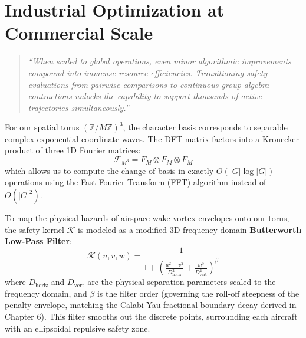 \documentclass[11pt,a4paper]{book}
\begin{document}
\section{Industrial Optimization at Commercial Scale}\label{sec:industrial_scale}
\begin{quote}
    \textit{``When scaled to global operations, even minor algorithmic improvements compound into immense resource efficiencies. Transitioning safety evaluations from pairwise comparisons to continuous group-algebra contractions unlocks the capability to support thousands of active trajectories simultaneously.''}
\end{quote}

For our spatial torus $(\mathbb{Z}/M\mathbb{Z})^3$, the character basis corresponds to separable complex exponential coordinate waves. The DFT matrix factors into a Kronecker product of three 1D Fourier matrices:
\begin{equation}
\label{eq:kronecker_fourier}
\mathcal{F}_{M^3} = F_M \otimes F_M \otimes F_M
\end{equation}
which allows us to compute the change of basis in exactly $O(\lvert G \rvert \log \lvert G \rvert)$ operations using the Fast Fourier Transform (FFT) algorithm instead of $O(\lvert G \rvert^2)$.

To map the physical hazards of airspace wake-vortex envelopes onto our torus, the safety kernel $\mathcal{K}$ is modeled as a modified 3D frequency-domain \textbf{Butterworth Low-Pass Filter}:
\begin{equation}
\label{eq:butterworth}
\widehat{\mathcal{K}}(u, v, w) = \frac{1}{1 + \left( \frac{u^2 + v^2}{D_{\text{horiz}}^2} + \frac{w^2}{D_{\text{vert}}^2} \right)^{\beta}}
\end{equation}
where $D_{\text{horiz}}$ and $D_{\text{vert}}$ are the physical separation parameters scaled to the frequency domain, and $\beta$ is the filter order (governing the roll-off steepness of the penalty envelope, matching the Calabi-Yau fractional boundary decay derived in Chapter 6). This filter smooths out the discrete points, surrounding each aircraft with an ellipsoidal repulsive safety zone.
\end{document}
